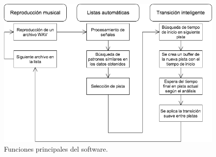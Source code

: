 \begin{figure}[h!]
\centering
\includegraphics[width=15cm]{./Figuras/diagram1}
\caption[Funcionamiento del software]{Funciones principales del software.}
\label{fig:func}
\end{figure}
